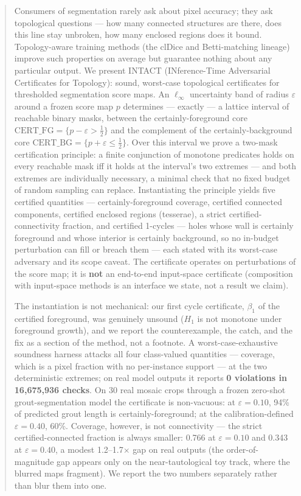 \documentclass[10pt]{article}
\newcommand{\CFG}{\mathrm{CERT\_FG}}
\newcommand{\CBG}{\mathrm{CERT\_BG}}
\newcommand{\eps}{\varepsilon}
\begin{document}
\begin{abstract}
Consumers of segmentation rarely ask about pixel accuracy; they ask
topological questions --- how many connected structures are there, does
this line stay unbroken, how many enclosed regions does it bound.
Topology-aware training methods (the clDice and Betti-matching lineage)
improve such properties on average but guarantee nothing about any
particular output. We present INTACT (INference-Time Adversarial
Certificates for Topology): sound, worst-case topological certificates
for thresholded segmentation score maps. An $\ell_\infty$ uncertainty
band of radius $\eps$ around a frozen score map $p$ determines ---
exactly --- a lattice interval of reachable binary masks, between the certainly-foreground core
$\CFG=\{p-\eps>\tfrac12\}$ and the complement of the certainly-background
core $\CBG=\{p+\eps\le\tfrac12\}$. Over this interval we prove a two-mask
certification principle: a finite conjunction of monotone predicates
holds on every reachable mask iff it holds at the interval's two extremes
--- and both extremes are individually necessary, a minimal check that no
fixed budget of random sampling can replace. Instantiating the principle
yields five certified quantities --- certainly-foreground coverage,
certified connected components, certified enclosed regions (tesserae), a
strict certified-connectivity fraction, and certified 1-cycles --- holes
whose wall is certainly foreground and whose interior is certainly
background, so no in-budget perturbation can fill or breach them --- each
stated with its worst-case adversary and its scope caveat. The certificate
operates on perturbations of the score map; it is \textbf{not} an
end-to-end input-space certificate (composition with input-space methods
is an interface we state, not a result we claim).

The instantiation is not mechanical: our first cycle certificate,
$\beta_1$ of the certified foreground, was genuinely unsound ($H_1$ is not
monotone under foreground growth), and we report the counterexample, the
catch, and the fix as a section of the method, not a footnote. A
worst-case-exhaustive soundness harness attacks all four class-valued quantities --- coverage,
which is a pixel fraction with no per-instance support --- at the two
deterministic
extremes; on real model outputs it reports \textbf{0 violations in
16{,}675{,}936 checks}. On 30 real mosaic crops through a
frozen zero-shot grout-segmentation model the certificate is non-vacuous:
at $\eps=0.10$, 94\% of predicted grout length is certainly-foreground; at
the calibration-defined $\eps=0.40$, 60\%. Coverage, however, is not
connectivity --- the strict certified-connected fraction is always
smaller: 0.766 at $\eps=0.10$ and 0.343 at $\eps=0.40$, a modest
1.2--1.7$\times$ gap on real outputs (the order-of-magnitude gap appears
only on the near-tautological toy track, where the blurred maps fragment).
We report the two numbers separately rather than blur them into one.
\end{abstract}
\end{document}
